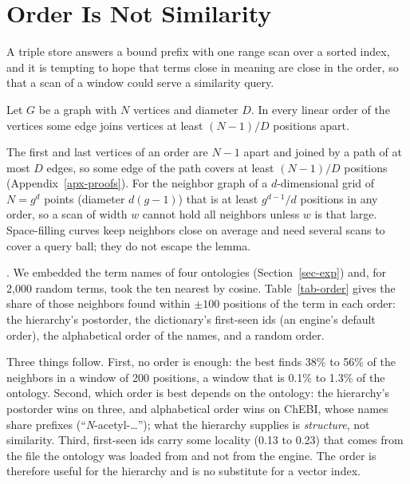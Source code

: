 \section{Order Is Not Similarity}
\label{sec-order}

A triple store answers a bound prefix with one range scan over a sorted index, and it
is tempting to hope that terms close in meaning are close in the order, so that a scan
of a window could serve a similarity query.

\begin{lemma}[Bandwidth]\label{lem-bw}
Let $G$ be a graph with $N$ vertices and diameter $D$.
In every linear order of the vertices some edge joins vertices at least $(N-1)/D$
positions apart.
\end{lemma}

\noindent
The first and last vertices of an order are $N-1$ apart and joined by a path of at
most $D$ edges, so some edge of the path covers at least $(N-1)/D$ positions
(Appendix~\ref{apx-proofs}).
For the neighbor graph of a $d$-dimensional grid of $N=g^d$ points (diameter
$d(g-1)$) that is at least $g^{d-1}/d$ positions in any order, so a scan of width $w$
cannot hold all neighbors unless $w$ is that large.
Space-filling curves keep neighbors close on average and need several scans to cover
a query ball; they do not escape the lemma.

.
We embedded the term names of four ontologies (Section~\ref{sec-exp}) and, for 2,000
random terms, took the ten nearest by cosine.
Table~\ref{tab-order} gives the share of those neighbors found within $\pm100$
positions of the term in each order: the hierarchy's postorder, the dictionary's
first-seen ids (an engine's default order), the alphabetical order of the names, and a
random order.



\noindent
Three things follow.
First, no order is enough: the best finds 38\% to 56\% of the neighbors in a window
of 200 positions, a window that is 0.1\% to 1.3\% of the ontology.
Second, which order is best depends on the ontology: the hierarchy's postorder wins on
three, and alphabetical order wins on ChEBI, whose names share prefixes
(``\emph{N}-acetyl-\ldots''); what the hierarchy supplies is \emph{structure}, not
similarity.
Third, first-seen ids carry some locality (0.13 to 0.23) that comes from the file the
ontology was loaded from and not from the engine.
The order is therefore useful for the hierarchy and is no substitute for a vector index.
